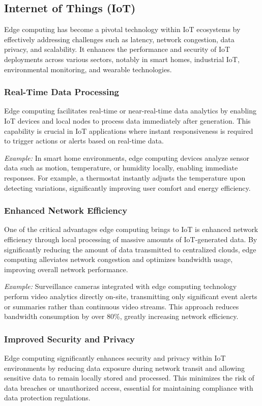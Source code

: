 \documentclass[runningheads]{llncs}
\begin{document}
\subsection{Internet of Things (IoT)}

Edge computing has become a pivotal technology within IoT ecosystems by effectively addressing challenges such as latency, network congestion, data privacy, and scalability. It enhances the performance and security of IoT deployments across various sectors, notably in smart homes, industrial IoT, environmental monitoring, and wearable technologies.

\subsubsection{Real-Time Data Processing}
Edge computing facilitates real-time or near-real-time data analytics by enabling IoT devices and local nodes to process data immediately after generation. This capability is crucial in IoT applications where instant responsiveness is required to trigger actions or alerts based on real-time data.

\textit{Example:} In smart home environments, edge computing devices analyze sensor data such as motion, temperature, or humidity locally, enabling immediate responses. For example, a thermostat instantly adjusts the temperature upon detecting variations, significantly improving user comfort and energy efficiency.

\subsubsection{Enhanced Network Efficiency}
One of the critical advantages edge computing brings to IoT is enhanced network efficiency through local processing of massive amounts of IoT-generated data. By significantly reducing the amount of data transmitted to centralized clouds, edge computing alleviates network congestion and optimizes bandwidth usage, improving overall network performance.

\textit{Example:} Surveillance cameras integrated with edge computing technology perform video analytics directly on-site, transmitting only significant event alerts or summaries rather than continuous video streams. This approach reduces bandwidth consumption by over 80\%, greatly increasing network efficiency.

\subsubsection{Improved Security and Privacy}
Edge computing significantly enhances security and privacy within IoT environments by reducing data exposure during network transit and allowing sensitive data to remain locally stored and processed. This minimizes the risk of data breaches or unauthorized access, essential for maintaining compliance with data protection regulations.
\end{document}
